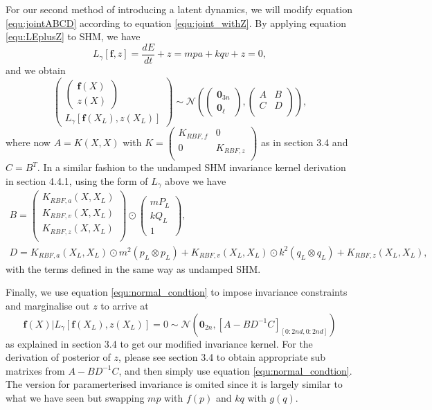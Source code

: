 \documentclass{statsmsc}
\begin{document}
For our second method of introducing a latent dynamics, we will modify equation \ref{equ:jointABCD} according to equation \ref{equ:joint_withZ}.
By applying equation \ref{equ:LEplusZ} to SHM, we have $$L_\gamma[\mathbf{f},z]=\frac{dE}{dt}+z = mpa+kqv+z=0,$$ and we obtain 
$$
\begin{pmatrix}
  \begin{pmatrix}
    \mathbf{f}(X)\\z(X)
  \end{pmatrix}\\L_\gamma[\mathbf{f}(X_L), z(X_L)]
\end{pmatrix}
\sim\mathcal{N}
\left(\begin{pmatrix}
  \mathbf{0}_{3n}\\\mathbf{0}_\ell
\end{pmatrix},\begin{pmatrix}
  A & B\\ C&D\\
\end{pmatrix}\right),
$$
where now $A=K(X,X)$ with $K=\begin{pmatrix}
  K_{RBF, f} & 0 \\ 0 & K_{RBF, z}\\
\end{pmatrix}$ as in section 3.4 and $C=B^T$.
In a similar fashion to the undamped SHM invariance kernel derivation in section 4.4.1, using the form of $L_\gamma$ above we have 
$$
\begin{gathered}
B=\begin{pmatrix}
  K_{RBF,a}(X, X_L) \\ K_{RBF, v}(X, X_L) \\ K_{RBF, z}(X, X_L)\\
\end{pmatrix}
\odot \begin{pmatrix}
  mP_L \\ kQ_L \\ 1
\end{pmatrix},\\ 
D = K_{RBF, a}(X_L, X_L)\odot m^2(p_L\otimes p_L) + K_{RBF, v}(X_L, X_L)\odot k^2(q_L\otimes q_L) + K_{RBF, z}(X_L, X_L),
\end{gathered}
$$
with the terms defined in the same way as undamped SHM.

Finally, we use equation \ref{equ:normal_condtion} to impose invariance constraints and marginalise out $z$ to arrive at
$$
\mathbf{f}(X)|L_\gamma[\mathbf{f}(X_L),z(X_L)]=0 \sim \mathcal{N}(\mathbf{0}_{2n}, [A-BD^{-1}C]_{[0:2nd, 0:2nd]})
$$
as explained in section 3.4 to get our modified invariance kernel.
For the derivation of posterior of $z$, please see section 3.4 to obtain appropriate sub matrixes from $A-BD^{-1}C$, and then simply use equation \ref{equ:normal_condtion}.
The version for paramerterised invariance is omited since it is largely similar to what we have seen but swapping $mp$ with $f(p)$ and $kq$ with $g(q)$.
\end{document}
